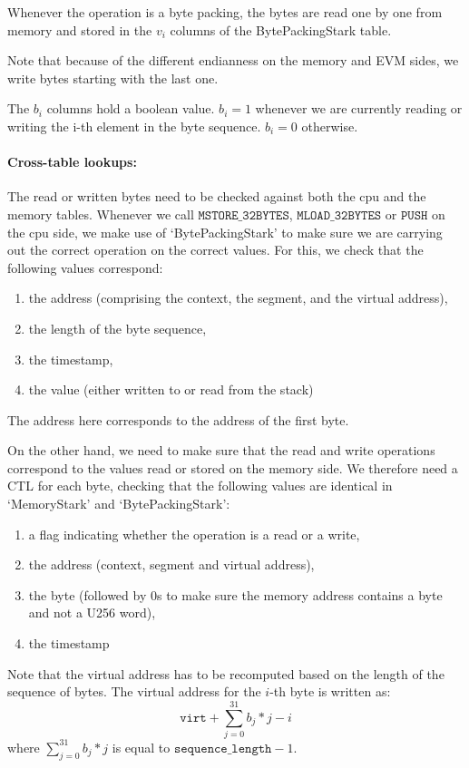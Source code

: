 Whenever the operation is a byte packing, the bytes are read one by one from memory and stored in the $v_i$ columns of the BytePackingStark table.

Note that because of the different endianness on the memory and EVM sides, we write bytes starting with the last one.

The $b_i$ columns hold a boolean value. $b_i = 1$ whenever we are currently reading or writing the i-th element in the byte sequence. $b_i = 0$ otherwise.

\paragraph{Cross-table lookups:}
The read or written bytes need to be checked against both the cpu and the memory tables. Whenever we call $\texttt{MSTORE\_32BYTES}$, $\texttt{MLOAD\_32BYTES}$ or $\texttt{PUSH}$ on the cpu side, we make use of `BytePackingStark' to make sure we are carrying out the correct operation on the correct values. For this, we check that the following values correspond:
\begin{enumerate}
    \item the address (comprising the context, the segment, and the virtual address),
    \item the length of the byte sequence,
    \item the timestamp,
    \item the value (either written to or read from the stack)
\end{enumerate}

The address here corresponds to the address of the first byte.

On the other hand, we need to make sure that the read and write operations correspond to the values read or stored on the memory side. We therefore need a CTL for each byte, checking that the following values are identical in `MemoryStark' and `BytePackingStark':
\begin{enumerate}
    \item a flag indicating whether the operation is a read or a write,
    \item the address (context, segment and virtual address),
    \item the byte (followed by 0s to make sure the memory address contains a byte and not a U256 word),
    \item the timestamp
\end{enumerate}

Note that the virtual address has to be recomputed based on the length of the sequence of bytes. The virtual address for the $i$-th byte is written as:
$$ \texttt{virt} + \sum_{j=0}^{31} b_j * j - i$$
where $\sum_{j=0}^{31} b_j * j$ is equal to $\texttt{sequence\_length} - 1$.

